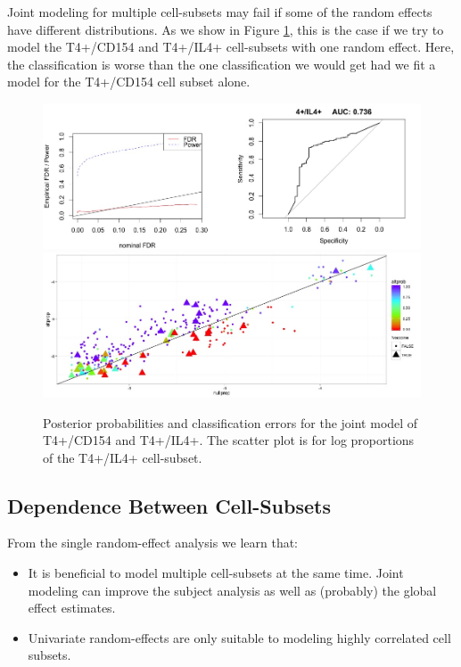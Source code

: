 \documentclass{article}\usepackage[]{graphicx}\usepackage[]{color}
\makeatletter
\def\maxwidth{ %
  \ifdim\Gin@nat@width>\linewidth
    \linewidth
  \else
    \Gin@nat@width
  \fi
}
\makeatother
\begin{document}
Joint modeling for multiple cell-subsets may fail if some of the random effects have different distributions. As we show in Figure \ref{IL4}, this is the case if we try to model the T4+/CD154 and T4+/IL4+ cell-subsets with one random effect. Here, the classification is worse than the one classification we would get had we fit a model for the T4+/CD154 cell subset alone.

\begin{figure}
\includegraphics[width=\maxwidth]{figures/IL4jointRoc} 
\includegraphics[width=\maxwidth]{figures/IL4jointScatter} \caption[]{Posterior probabilities and classification errors  for the joint model of T4+/CD154 and T4+/IL4+. The scatter plot is for log proportions of the T4+/IL4+ cell-subset.}
\label{IL4}
\end{figure}






\subsection{Dependence Between Cell-Subsets}
From the single random-effect analysis we learn that:
\begin{itemize}
\item It is beneficial to model multiple cell-subsets at the same time. Joint modeling can improve the subject analysis as well as (probably) the global effect estimates.
\item Univariate random-effects are only suitable to modeling highly correlated cell subsets. 
\end{itemize}
\end{document}
